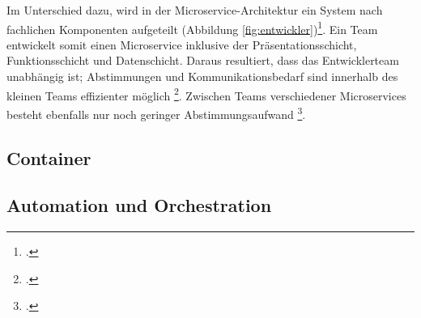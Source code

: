Im Unterschied dazu, wird in der Microservice-Architektur ein System nach fachlichen Komponenten aufgeteilt (Abbildung \ref{fig:entwickler})\footcite[Vgl.][S.81 f.]{albrecht2020}. Ein Team entwickelt somit einen Microservice inklusive der Präsentationsschicht, Funktionsschicht und Datenschicht. Daraus resultiert, dass das Entwicklerteam unabhängig ist; Abstimmungen und Kommunikationsbedarf sind innerhalb des kleinen Teams effizienter möglich \footcite[Vgl.][S.41]{wolff2018}. Zwischen Teams verschiedener Microservices besteht ebenfalls nur noch geringer Abstimmungsaufwand \footcite[Vgl.][S.81]{albrecht2020}.



\subsection{Container}


\subsection{Automation und Orchestration}
